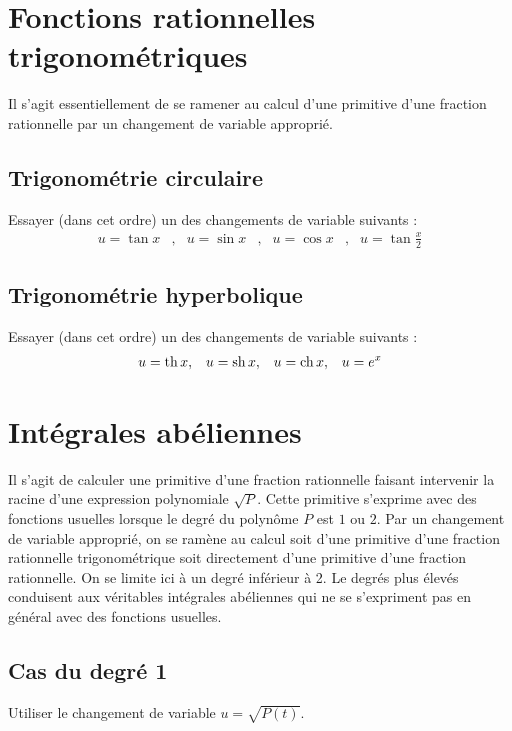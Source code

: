 \section{Fonctions rationnelles trigonométriques}
Il s'agit essentiellement de se ramener au calcul d'une primitive d'une fraction rationnelle par un changement de variable approprié.
\subsection{Trigonométrie circulaire}
Essayer (dans cet ordre) un des changements de variable suivants :
\begin{align*}
 u=\tan x &,& u=\sin x &,& u=\cos x &,& u=\tan \frac{x}{2}
\end{align*}
\subsection{Trigonométrie hyperbolique}
Essayer (dans cet ordre) un des changements de variable suivants :
\begin{align*}
 u=\mathop{\mathrm{th}} x &,& u=\mathop{\mathrm{sh}} x &,& u=\mathop{\mathrm{ch}} x &,& u= e^{x}
\end{align*}

\section{Intégrales \og abéliennes\fg}
Il s'agit de calculer une primitive d'une fraction rationnelle faisant intervenir la racine d'une expression polynomiale $\sqrt{P}$. Cette primitive s'exprime avec des fonctions usuelles lorsque le degré du polynôme $P$ est $1$ ou $2$. Par un changement de variable approprié, on se ramène au calcul soit d'une primitive d'une fraction rationnelle trigonométrique soit directement d'une primitive d'une fraction rationnelle.\newline
On se limite ici à un degré inférieur à 2.  Le degrés plus élevés conduisent aux véritables intégrales abéliennes qui ne se s'expriment pas en général avec des fonctions usuelles.
\subsection{Cas du degré 1}
Utiliser le changement de variable $u=\sqrt{P(t)}$.
